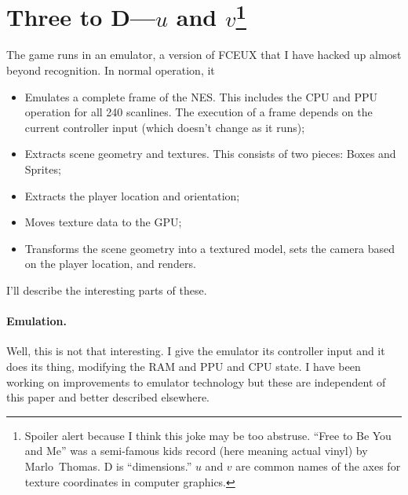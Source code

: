 \documentclass[twocolumn]{article}
\begin{document}
\section[Three to D---$u$ and $v$]{Three to D---$u$ and $v$\footnote{Spoiler alert because I think
this joke may be too abstruse. ``Free to Be You and Me'' was a
semi-famous kids record (here meaning actual vinyl) by 
Marlo~Thomas. D is ``dimensions.'' $u$ and $v$ are common names of
the axes for texture coordinates in computer graphics.}}

The game runs in an emulator, a version of FCEUX\cite{fceux} that I
have hacked up almost beyond recognition. In normal operation, it

\begin{itemize}
\item Emulates a complete frame of the NES. This includes the CPU and
  PPU operation for all 240 scanlines. The execution of a frame depends
  on the current controller input (which doesn't change as it runs);
\item Extracts scene geometry and textures. This consists of two
  pieces: Boxes and Sprites;
\item Extracts the player location and orientation;
\item Moves texture data to the GPU;
\item Transforms the scene geometry into a textured model, sets the camera
  based on the player location, and renders.
\end{itemize}

I'll describe the interesting parts of these.

\paragraph{Emulation.} 
Well, this is not that interesting. I give the emulator its controller
input and it does its thing, modifying the RAM and PPU and CPU state.
I have been working on improvements to emulator technology but these
are independent of this paper and better described elsewhere.
\end{document}
